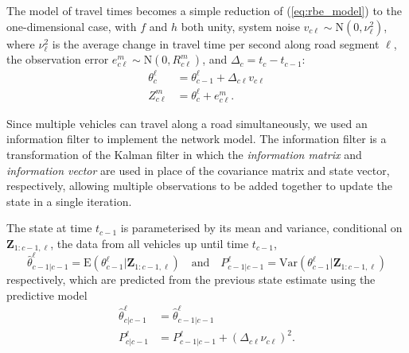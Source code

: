 The model of travel times becomes a simple reduction of (\ref{eq:rbe_model}) 
to the one-dimensional case, 
with $f$ and $h$ both unity,
system noise $v_{c\ell} \sim \mathrm{N}(0, \nu_\ell^2)$,
where $\nu_\ell^2$ is the average change in travel time per second
along road segment $\ell$,
the observation error $e_{c\ell}^{m} \sim \mathrm{N}(0, R_{c\ell}^{m})$,
and $\Delta_c = t_c - t_{c-1}$:
\begin{equation*}
\begin{split}
\theta_c^\ell &= \theta_{c-1}^\ell + \Delta_{c\ell} v_{c\ell} \\
Z_{c\ell}^{m} &= \theta_c^\ell + e_{c\ell}^{m}.
\end{split}
\end{equation*}


Since multiple vehicles can travel along a road simultaneously,
we used an information filter to implement the network model.
The information filter is a transformation of the Kalman filter in which the
\emph{information matrix} and \emph{information vector} are used in place of 
the covariance matrix and state vector, respectively,
allowing multiple observations to be added together to update the state
in a single iteration.


The state at time $t_{c-1}$ is parameterised by its mean and variance,
conditional on $\boldsymbol{Z}_{1:c-1,\ell}$, 
the data from all vehicles up until time $t_{c-1}$,
\begin{equation*}
\hat \theta_{c-1|c-1}^\ell = 
\mathrm{E}(\theta_{c-1}^\ell | \boldsymbol{Z}_{1:c-1,\ell})
\quad\text{and}\quad
P_{c-1|c-1}^\ell = 
\mathrm{Var}(\theta_{c-1}^\ell | \boldsymbol{Z}_{1:c-1,\ell})
\end{equation*}
respectively,
which are predicted from the previous state estimate using the predictive model
\begin{align*}
\label{eq:kf_transition}
\hat \theta^\ell_{c|c-1} &= \hat \theta^\ell_{c-1|c-1} \\
P^\ell_{c|c-1} &= P^\ell_{c-1|c-1} + (\Delta_{c\ell} \nu_{c\ell})^2.
\end{align*}

